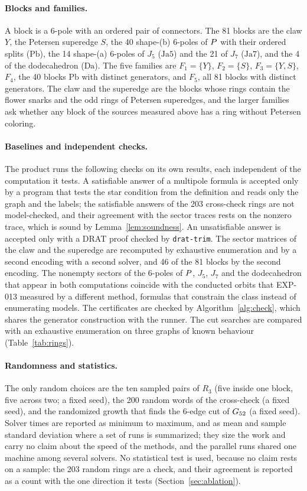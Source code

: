 \paragraph{Blocks and families.} A block is a 6-pole with an ordered pair of connectors. The 81 blocks are the claw $Y$,
the Petersen superedge $S$, the 40 shape-(b) 6-poles of $P$ with their ordered splits ($\mathrm{Pb}$), the 14 shape-(a) 6-poles of $J_5$ ($\mathrm{Ja5}$) and the 21
of $J_7$ ($\mathrm{Ja7}$), and the 4 of the dodecahedron ($\mathrm{Da}$). The five families are $F_1 = \{Y\}$, $F_2 = \{S\}$,
$F_3 = \{Y, S\}$, $F_4$, the 40 blocks $\mathrm{Pb}$ with \nGenFfour{} distinct generators, and $F_5$, all 81 blocks with \nGenFfive{} distinct generators.
The claw and the superedge are the blocks whose rings contain the flower snarks and the odd rings of Petersen superedges, and the larger
families ask whether any block of the sources measured above has a ring without Petersen coloring.

\paragraph{Baselines and independent checks.} The product runs the following checks on its own results, each independent of the
computation it tests. A satisfiable answer of a multipole formula is accepted only by a program that tests the star condition from the definition and reads only the graph and the
labels; the satisfiable answers of the 203 cross-check rings are not model-checked, and their agreement with the sector traces rests on the nonzero trace, which is sound by Lemma~\ref{lem:soundness}. An unsatisfiable answer is accepted only with a DRAT proof checked by \texttt{drat-trim}. The sector matrices of the claw and the superedge are recomputed by
exhaustive enumeration and by a second encoding with a second solver, and 46 of the 81 blocks by the second encoding. The nonempty sectors of the 6-poles of $P$, $J_5$,
$J_7$ and the dodecahedron that appear in both computations coincide with the conducted orbits that EXP-013 measured by a
different method, formulas that constrain the class instead of enumerating models. The certificates are checked by Algorithm~\ref{alg:check}, which shares the generator construction with the runner. The cut searches are compared with an
exhaustive enumeration on three graphs of known behaviour (Table~\ref{tab:rings}).

\paragraph{Randomness and statistics.} The only random choices are the ten sampled pairs of $R_3$ (five inside one block, five across two; a fixed seed),
the 200 random words of the cross-check (a fixed seed), and the randomized growth that finds the 6-edge cut of $G_{52}$ (a fixed seed). Solver times are reported as
minimum to maximum, and as mean and sample standard deviation where a set of runs is summarized; they size the work and carry no claim about the speed of the
methods, and the parallel runs shared one machine among several solvers. No statistical test is used, because no claim rests on a sample: the 203 random rings are a
check, and their agreement is reported as a count with the one direction it tests (Section~\ref{sec:ablation}).
